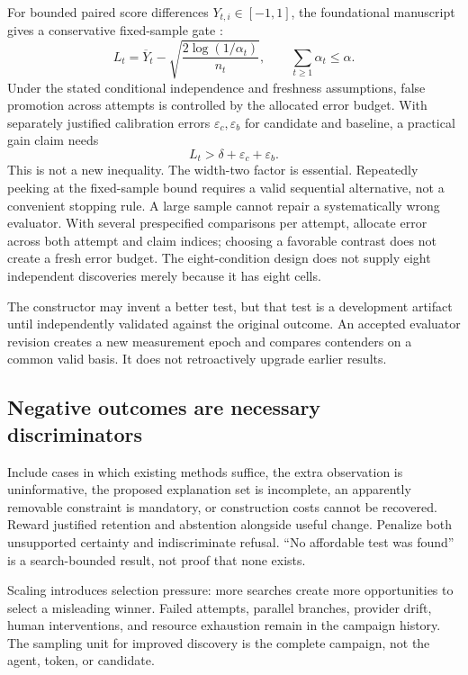 \documentclass[11pt,letterpaper]{article}
\theoremstyle{remark}\newtheorem{remark}{Remark}[section]
\begin{document}
For bounded paired score differences $Y_{t,i}\in[-1,1]$, the foundational manuscript gives a conservative fixed-sample gate \citep{transform}:
\begin{equation}
L_t=\overline{Y}_t-\sqrt{\frac{2\log(1/\alpha_t)}{n_t}},\qquad
\sum_{t\geq1}\alpha_t\leq\alpha.
\label{eq:gate}
\end{equation}
Under the stated conditional independence and freshness assumptions, false promotion across attempts is controlled by the allocated error budget. With separately justified calibration errors $\varepsilon_c,\varepsilon_b$ for candidate and baseline, a practical gain claim needs
\begin{equation}
L_t>\delta+\varepsilon_c+\varepsilon_b.
\end{equation}
This is not a new inequality. The width-two factor is essential. Repeatedly peeking at the fixed-sample bound requires a valid sequential alternative, not a convenient stopping rule. A large sample cannot repair a systematically wrong evaluator. With several prespecified comparisons per attempt, allocate error across both attempt and claim indices; choosing a favorable contrast does not create a fresh error budget. The eight-condition design does not supply eight independent discoveries merely because it has eight cells.

The constructor may invent a better test, but that test is a development artifact until independently validated against the original outcome. An accepted evaluator revision creates a new measurement epoch and compares contenders on a common valid basis. It does not retroactively upgrade earlier results.

\subsection{Negative outcomes are necessary discriminators}
Include cases in which existing methods suffice, the extra observation is uninformative, the proposed explanation set is incomplete, an apparently removable constraint is mandatory, or construction costs cannot be recovered. Reward justified retention and abstention alongside useful change. Penalize both unsupported certainty and indiscriminate refusal. ``No affordable test was found'' is a search-bounded result, not proof that none exists.

Scaling introduces selection pressure: more searches create more opportunities to select a misleading winner. Failed attempts, parallel branches, provider drift, human interventions, and resource exhaustion remain in the campaign history. The sampling unit for improved discovery is the complete campaign, not the agent, token, or candidate.
\end{document}
